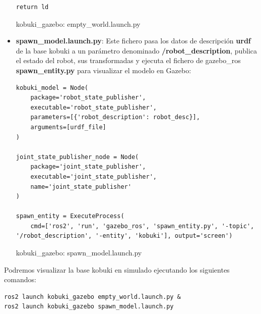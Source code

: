 \begin{itemize}
\begin{code}[H]
\begin{lstlisting}[frame=single]
	return ld
\end{lstlisting}
\caption[kobuki\_gazebo: empty\_world.launch.py]{kobuki\_gazebo: empty\_world.launch.py}
\label{cod:kobuki_gazebo_empty_world}
\end{code}

	\item \textbf{spawn\_model.launch.py}: Este fichero pasa los datos de descripción \textbf{urdf} de la base kobuki a un parámetro denominado \textbf{/robot\_description}, publica el estado del robot, sus transformadas y ejecuta el fichero de gazebo\_ros \textbf{spawn\_entity.py} para visualizar el modelo en Gazebo:
	
\begin{code}[H]
\begin{lstlisting}[frame=single]
kobuki_model = Node(
	package='robot_state_publisher',
	executable='robot_state_publisher',
	parameters=[{'robot_description': robot_desc}],
	arguments=[urdf_file]
)

joint_state_publisher_node = Node(
	package='joint_state_publisher',
	executable='joint_state_publisher',
	name='joint_state_publisher'
)

spawn_entity = ExecuteProcess(
	cmd=['ros2', 'run', 'gazebo_ros', 'spawn_entity.py', '-topic', '/robot_description', '-entity', 'kobuki'], output='screen')
\end{lstlisting}
\caption[kobuki\_gazebo: spawn\_model.launch.py]{kobuki\_gazebo: spawn\_model.launch.py}
\label{cod:kobuki_gazebo_spawn_model}
\end{code}
\end{itemize}


Podremos visualizar la base kobuki en simulado ejecutando los siguientes comandos:\\
\begin{lstlisting}
ros2 launch kobuki_gazebo empty_world.launch.py &
ros2 launch kobuki_gazebo spawn_model.launch.py
\end{lstlisting}

